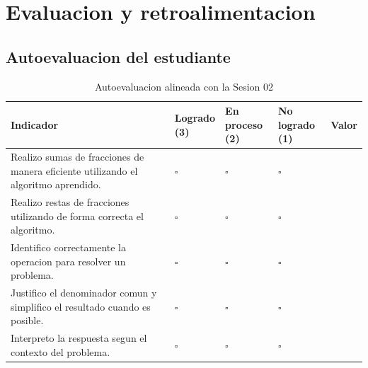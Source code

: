 \documentclass[
	spanish,
	letterpaper, oneside
]{article}
\begin{document}
\section{Evaluacion y retroalimentacion}

\subsection{Autoevaluacion del estudiante}

\begin{table}[H]
\centering
\caption{Autoevaluacion alineada con la Sesion 02}
\label{tab:autoevaluacion-sesion02}

\small
\renewcommand{\arraystretch}{1.45}
\setlength{\tabcolsep}{5pt}

\begin{tabularx}{\textwidth}{@{}
>{\raggedright\arraybackslash}X
>{\centering\arraybackslash}p{}
>{\centering\arraybackslash}p{}
>{\centering\arraybackslash}p{}
>{\centering\arraybackslash}p{}
@{}}
\toprule
\textbf{Indicador} &
\makecell{\textbf{Logrado}\\\textbf{(3)}} &
\makecell{\textbf{En proceso}\\\textbf{(2)}} &
\makecell{\textbf{No logrado}\\\textbf{(1)}} &
\textbf{Valor} \\
\midrule

Realizo sumas de fracciones de manera eficiente utilizando el algoritmo aprendido.
& $\square$ & $\square$ & $\square$ & \\

Realizo restas de fracciones utilizando de forma correcta el algoritmo.
& $\square$ & $\square$ & $\square$ & \\

Identifico correctamente la operacion para resolver un problema.
& $\square$ & $\square$ & $\square$ & \\

Justifico el denominador comun y simplifico el resultado cuando es posible.
& $\square$ & $\square$ & $\square$ & \\

Interpreto la respuesta segun el contexto del problema.
& $\square$ & $\square$ & $\square$ & \\

\bottomrule
\end{tabularx}

\end{table}
\end{document}

